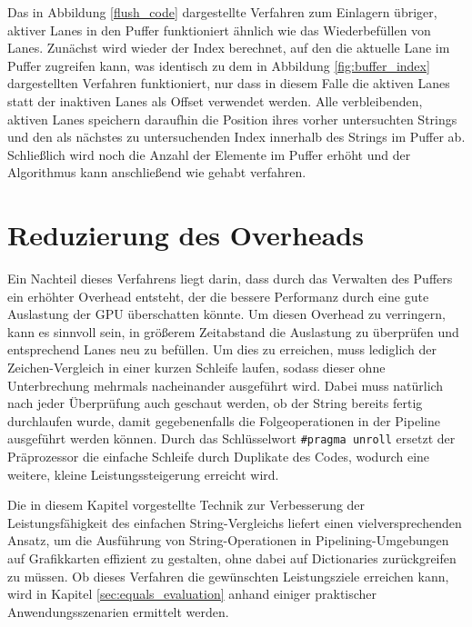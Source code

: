 Das in Abbildung \ref{flush_code} dargestellte Verfahren zum Einlagern übriger, aktiver Lanes in den Puffer funktioniert ähnlich wie das Wiederbefüllen von Lanes.
Zunächst wird wieder der Index berechnet, auf den die aktuelle Lane im Puffer zugreifen kann, was identisch zu dem in Abbildung \ref{fig:buffer_index} dargestellten Verfahren funktioniert, nur dass in diesem Falle die aktiven Lanes statt der inaktiven Lanes als Offset verwendet werden.
Alle verbleibenden, aktiven Lanes speichern daraufhin die Position ihres vorher untersuchten Strings und den als nächstes zu untersuchenden Index innerhalb des Strings im Puffer ab.
Schließlich wird noch die Anzahl der Elemente im Puffer erhöht und der Algorithmus kann anschließend wie gehabt verfahren.

\section{Reduzierung des Overheads}
\label{sec:unroll}

Ein Nachteil dieses Verfahrens liegt darin, dass durch das Verwalten des Puffers ein erhöhter Overhead entsteht, der die bessere Performanz durch eine gute Auslastung der GPU überschatten könnte.
Um diesen Overhead zu verringern, kann es sinnvoll sein, in größerem Zeitabstand die Auslastung zu überprüfen und entsprechend Lanes neu zu befüllen.
Um dies zu erreichen, muss lediglich der Zeichen-Vergleich in einer kurzen Schleife laufen, sodass dieser ohne Unterbrechung mehrmals nacheinander ausgeführt wird.
Dabei muss natürlich nach jeder Überprüfung auch geschaut werden, ob der String bereits fertig durchlaufen wurde, damit gegebenenfalls die Folgeoperationen in der Pipeline ausgeführt werden können.
Durch das Schlüsselwort \texttt{\#pragma unroll} ersetzt der Präprozessor die einfache Schleife durch Duplikate des Codes, wodurch eine weitere, kleine Leistungssteigerung erreicht wird.

Die in diesem Kapitel vorgestellte Technik zur Verbesserung der Leistungsfähigkeit des einfachen String-Vergleichs liefert einen vielversprechenden Ansatz, um die Ausführung von String-Operationen in Pipelining-Umgebungen auf Grafikkarten effizient zu gestalten, ohne dabei auf Dictionaries zurückgreifen zu müssen.
Ob dieses Verfahren die gewünschten Leistungsziele erreichen kann, wird in Kapitel \ref{sec:equals_evaluation} anhand einiger praktischer Anwendungsszenarien ermittelt werden.